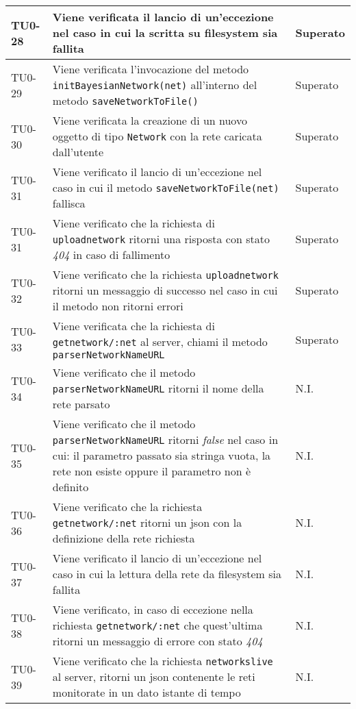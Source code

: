 \begin{longtable}{|C{.15\textwidth}|m{.65\textwidth}|C{.20\textwidth}|}
\hline 
 TU0-28 & Viene verificata il lancio di un'eccezione nel caso in cui la scritta su filesystem sia fallita & Superato \\ 
\hline 
{}TU0-29 & Viene verificata l'invocazione del metodo \texttt{initBayesianNetwork(net)} all'interno del metodo \texttt{saveNetworkToFile()} & Superato \\ 
\hline 
TU0-30 & Viene verificata la creazione di un nuovo oggetto di tipo \texttt{Network} con la rete caricata dall'utente & Superato \\ 
\hline
{} TU0-31 & Viene verificato il lancio di un'eccezione nel caso in cui il metodo \texttt{saveNetworkToFile(net)} fallisca & Superato \\
\hline
TU0-31 & Viene verificato che la richiesta di \texttt{uploadnetwork} ritorni una risposta con stato \textit{404} in caso di fallimento & Superato \\ 
\hline
{} TU0-32 & Viene verificato che la richiesta \texttt{uploadnetwork} ritorni un messaggio di successo nel caso in cui il metodo non ritorni errori & Superato \\
\hline
TU0-33 & Viene verificata che la richiesta di \texttt{getnetwork/:net} al server, chiami il metodo \texttt{parserNetworkNameURL} & Superato \\ 
\hline
{} TU0-34 & Viene verificato che il metodo \texttt{parserNetworkNameURL} ritorni il nome della rete parsato & N.I. \\ 
\hline 
TU0-35 & Viene verificato che il metodo \texttt{parserNetworkNameURL} ritorni \textit{false} nel caso in cui: il parametro passato sia stringa vuota, la rete non esiste oppure il parametro non è definito & N.I. \\ 
\hline 
{}TU0-36 & Viene verificato che la richiesta \texttt{getnetwork/:net} ritorni un json con la definizione della rete richiesta & N.I. \\ 
\hline 
TU0-37 & Viene verificato il lancio di un'eccezione nel caso in cui la lettura della rete da filesystem sia fallita & N.I. \\
\hline
  TU0-38 & Viene verificato, in caso di eccezione nella richiesta \texttt{getnetwork/:net} che quest'ultima ritorni un messaggio di errore con stato \textit{404} & N.I. \\ 
 \hline
 TU0-39 & Viene verificato che la richiesta \texttt{networkslive} al server, ritorni un json contenente le reti monitorate in un dato istante di tempo & N.I. \\ 

\end{longtable}
